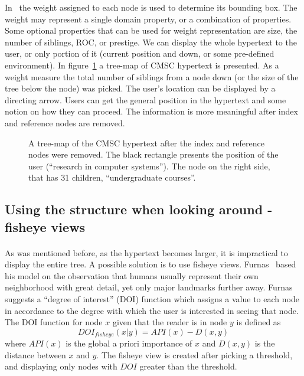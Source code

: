 \documentclass[twocolumn,10pt]{article}
\begin{document}
In~\cite{bb} the weight assigned to each node is used to determine 
its bounding box. The weight may represent a single domain property,
or a combination of properties. Some optional properties that can be used
for weight representation are size, the number of
siblings, ROC,  or prestige. We can display the whole
hypertext to the user, or only portion of it (current position and
down, or some pre-defined environment). In figure~\ref{fig:treemap} 
a tree-map of 
CMSC hypertext is presented.
As a weight measure the total number of siblings from a
node down (or the
size of the tree below the node) was picked.
The user's location can be displayed by a directing arrow.
Users can get the general position in the hypertext and some
notion on how they can proceed. The information is more 
meaningful after index and reference nodes are removed.
\begin{figure}
\vspace*{9.5cm}
\caption [10pt] { A tree-map of the CMSC hypertext after the index and 
reference nodes were removed. The black rectangle presents the
position of the user (``research in computer systems''). The node
on the right side, that has 31 children, ``undergraduate courses''. }
\label{fig:treemap}
\end{figure}


\subsection*{Using the structure when looking around - fisheye views}
\paragraph{}
As was mentioned before, as the hypertext becomes larger, it is impractical
to display the entire tree. A possible solution is to use fisheye views.
Furnas~\cite{fur86} based his model on the observation that humans usually
represent their own neighborhood with great detail, yet only major landmarks
further away. Furnas suggests a ``degree of interest'' (DOI) function 
which assigns
a value to each node in accordance to the degree with which the user is 
interested in seeing that node. The DOI function for node $ x$ given that
the reader is in node $ y$ is defined as
\[ DOI_{fisheye} (x|y) = API(x) - D(x,y)
\]
where $ API(x)$ is the global a priori importance of $ x$ and $ D(x,y)$
is the distance between $ x$ and $ y$. The fisheye view is created 
after picking a threshold, and displaying only nodes with $DOI$ greater
than the threshold.
\end{document}
